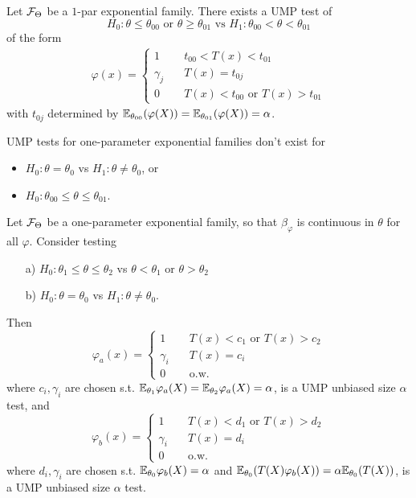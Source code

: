 \begin{cor}
	Let $\mathcal{F}_\Theta$ be a $1$-par exponential family. There exists a UMP test of 
	$$H_0: \theta \leq \theta_{00} \text{ or } \theta\geq \theta_{01} \text{ vs } H_1:\theta_{00}<\theta<\theta_{01}$$
	of the form 
	\begin{align*}
	\varphi(x) = \begin{cases}
	1 &\quad t_{00} <T(x) < t_{01} \\
	\gamma_j &\quad T(x) = t_{0j} \\
	0 &\quad T(x) < t_{00} \text{ or } T(x)> t_{01}
	\end{cases}
	\end{align*}
	with $t_{0j}$ determined by $\mathbb{E}_{\theta_{00}} ( \varphi(X) ) = \mathbb{E}_{\theta_{01}} ( \varphi(X) ) = \alpha$.
\end{cor}
\begin{remark}
	UMP tests for one-parameter exponential families don't exist for 
	\begin{itemize}
		\item $H_0: \theta=\theta_0$ vs $H_1: \theta \neq \theta_0$, or
		\item $H_0: \theta_{00} \leq \theta \leq \theta_{01}$.
	\end{itemize}
\end{remark}

\begin{thm}
	Let $\mathcal{F}_\Theta$ be a one-parameter exponential family, so that $\beta_\varphi$ is continuous in $\theta$ for all $\varphi$. Consider testing 
	\begin{enumerate}
		\item[a)] $H_0: \theta_{1} \leq \theta \leq \theta_{2}$ vs $\theta< \theta_1 \text{ or } \theta>\theta_2$
		\item[b)] $H_0: \theta=\theta_0$ vs $H_1: \theta \neq \theta_0$.
	\end{enumerate}
	Then $$\varphi_a(x) = \begin{cases}
	1 &\quad  T(x)<c_1 \text{ or } T(x) > c_2 \\
	\gamma_i &\quad T(x) = c_i \\
	0 &\quad \text{o.w.}
	\end{cases}$$
	where $c_i,\gamma_i$ are chosen s.t. $\mathbb{E}_{\theta_1} \varphi_a(X) = \mathbb{E}_{\theta_2} \varphi_a(X)  =\alpha$, is a UMP unbiased size $\alpha$ test, and 
	$$\varphi_b(x) = \begin{cases}
	1 &\quad  T(x)<d_1 \text{ or } T(x) > d_2 \\
	\gamma_i &\quad T(x) = d_i \\
	0 &\quad \text{o.w.}
	\end{cases}$$
	where $d_i,\gamma_i$ are chosen s.t. $\mathbb{E}_{\theta_0} \varphi_b(X)=\alpha$ and $\mathbb{E}_{\theta_0}(T(X) \varphi_b(X)) = \alpha \mathbb{E}_{\theta_0}(T(X))$, is a UMP unbiased size $\alpha$ test.
\end{thm}
 

